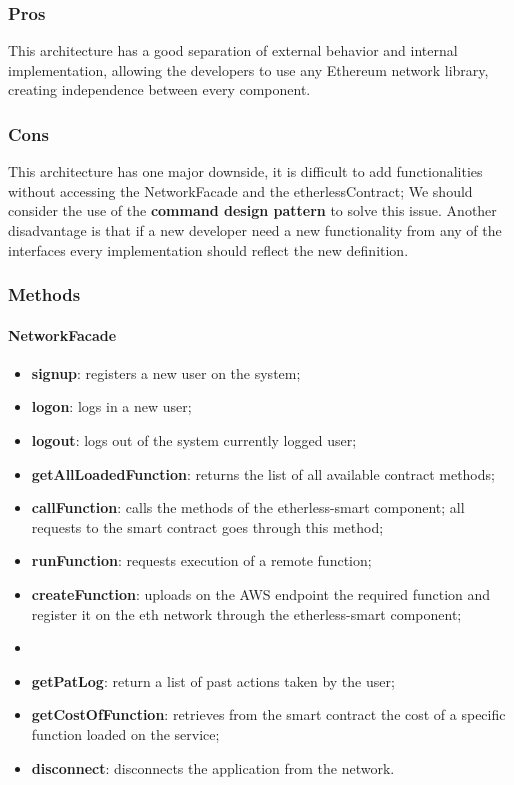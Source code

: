 \subsubsection{Pros}
This architecture has a good separation of external behavior and internal implementation,
allowing the developers to use any Ethereum network library, creating independence between every component.
\subsubsection{Cons}
This architecture has one major downside, it is difficult to add functionalities without accessing the NetworkFacade and the etherlessContract; We should consider the use of the \textbf{command design pattern} to solve this issue.
Another disadvantage is that if a new developer need a new functionality from any of the interfaces every implementation should reflect the new definition.
\subsubsection{Methods}
\paragraph{NetworkFacade}
\begin{itemize}
    \item \textbf{signup}: registers a new user on the system;
    \item \textbf{logon}: logs in a new user; 
    \item \textbf{logout}: logs out of the system currently logged user;
	\item \textbf{getAllLoadedFunction}: returns the list of all available contract methods;
    \item \textbf{callFunction}: calls the methods of the etherless-smart component; all requests to the smart contract goes through this method;
    \item \textbf{runFunction}: requests execution of a remote function;
    \item \textbf{createFunction}: uploads on the AWS endpoint the required function and register it on the eth network through the etherless-smart component;
    \item \item \textbf{getPatLog}: return a list of past actions taken by the user;
    \item \textbf{getCostOfFunction}: retrieves from the smart contract the cost of a specific function loaded on the service;
    \item \textbf{disconnect}: disconnects the application from the network.
\end{itemize}

